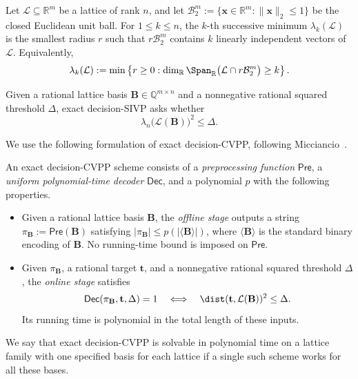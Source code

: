 \ifdefined\withModuleSIVP
\begin{definition}
Let \(\mathcal L\subseteq\mathbb R^m\) be a lattice of rank \(n\), and let
\(\mathcal B_2^m:=\{\mathbf x\in\mathbb R^m:\|\mathbf x\|_2\leq1\}\) be the
closed Euclidean unit ball.  For \(1\leq k\leq n\), the \(k\)-th successive minimum
\(\lambda_k(\mathcal L)\) is the smallest radius \(r\) such that
\(r\mathcal B_2^m\) contains \(k\) linearly independent vectors of
\(\mathcal L\).  Equivalently,
\[
 \lambda_k(\mathcal L)
 :=\min\left\{r\geq0:
 \dim_{\mathbb R}\Span_{\mathbb R}
 \bigl(\mathcal L\cap r\mathcal B_2^m\bigr)\geq k
 \right\}.
\]
\end{definition}

\begin{definition}
\label{def:exact-sivp}
Given a rational lattice basis \(\mathbf B\in\mathbb Q^{m\times n}\) and a
nonnegative rational squared threshold \(\Delta\), exact decision-SIVP asks
whether
\[
 \lambda_n\bigl(\mathcal L(\mathbf B)\bigr)^2\leq\Delta.
\]
\end{definition}
\fi

We use the following formulation of exact decision-CVPP, following
Micciancio~\cite{Micciancio2001}.

\begin{definition}
\label{def:cvpp}
An exact decision-CVPP scheme consists of a
\emph{preprocessing function} $\mathsf{Pre}$, a
\emph{uniform polynomial-time decoder} $\mathsf{Dec}$, and a
polynomial $p$ with the following properties.
\begin{itemize}
 \item Given a rational lattice basis $\mathbf B$, the
       \emph{offline stage} outputs
       a string
       $\pi_{\mathbf B}:=\mathsf{Pre}(\mathbf B)$ satisfying
       $|\pi_{\mathbf B}|\leq p(|\langle\mathbf B\rangle|)$, where
       $\langle\mathbf B\rangle$ is the standard binary encoding of
       $\mathbf B$.  No running-time bound is imposed on
       $\mathsf{Pre}$.
 \item Given $\pi_{\mathbf B}$, a rational target $\mathbf t$, and a
       nonnegative rational squared threshold $\Delta$, the
       \emph{online stage}
       satisfies
       \[
        \mathsf{Dec}(\pi_{\mathbf B},\mathbf t,\Delta)=1
        \quad\Longleftrightarrow\quad
        \dist(\mathbf t,\mathcal L(\mathbf B))^2\leq\Delta.
       \]
       Its running time is polynomial in the total length of these inputs.
\end{itemize}
We say that exact decision-CVPP is solvable in polynomial time
on a lattice family with one specified basis for each lattice if a single such
scheme works for all these bases.
\end{definition}

